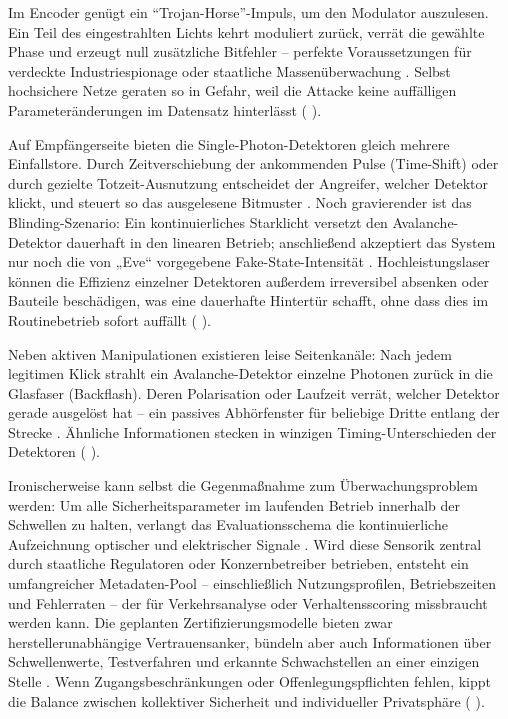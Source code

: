 Im Encoder genügt ein “Trojan-Horse”-Impuls, um den Modulator auszulesen. Ein Teil des eingestrahlten Lichts kehrt moduliert zurück, verrät die gewählte Phase und erzeugt null zusätzliche Bitfehler – perfekte Voraussetzungen für verdeckte Industriespionage oder staatliche Massenüberwachung . Selbst hochsichere Netze geraten so in Gefahr, weil die Attacke keine auffälligen Parameteränderungen im Datensatz hinterlässt (\cite{sunReviewSecurityEvaluation2022} ).

Auf Empfängerseite bieten die Single-Photon-Detektoren gleich mehrere Einfallstore. Durch Zeitverschiebung der ankommenden Pulse (Time-Shift) oder durch gezielte Totzeit-Ausnutzung entscheidet der Angreifer, welcher Detektor klickt, und steuert so das ausgelesene Bitmuster . Noch gravierender ist das Blinding-Szenario: Ein kontinuierliches Starklicht versetzt den Avalanche-Detektor dauerhaft in den linearen Betrieb; anschließend akzeptiert das System nur noch die von „Eve“ vorgegebene Fake-State-Intensität . Hochleistungslaser können die Effizienz einzelner Detektoren außerdem irreversibel absenken oder Bauteile beschädigen, was eine dauerhafte Hintertür schafft, ohne dass dies im Routinebetrieb sofort auffällt (\cite{sunReviewSecurityEvaluation2022} ).

Neben aktiven Manipulationen existieren leise Seitenkanäle: Nach jedem legitimen Klick strahlt ein Avalanche-Detektor einzelne Photonen zurück in die Glasfaser (Backflash). Deren Polarisation oder Laufzeit verrät, welcher Detektor gerade ausgelöst hat – ein passives Abhörfenster für beliebige Dritte entlang der Strecke . Ähnliche Informationen stecken in winzigen Timing-Unterschieden der Detektoren (\cite{sunReviewSecurityEvaluation2022} ).

Ironischerweise kann selbst die Gegenmaßnahme zum Überwachungsproblem werden: Um alle Sicherheitsparameter im laufenden Betrieb innerhalb der Schwellen zu halten, verlangt das Evaluationsschema die kontinuierliche Aufzeichnung optischer und elektrischer Signale . Wird diese Sensorik zentral durch staatliche Regulatoren oder Konzernbetreiber betrieben, entsteht ein umfangreicher Metadaten-Pool – einschließlich Nutzungsprofilen, Betriebszeiten und Fehlerraten – der für Verkehrsanalyse oder Verhaltensscoring missbraucht werden kann. Die geplanten Zertifizierungsmodelle bieten zwar herstellerunabhängige Vertrauensanker, bündeln aber auch Informationen über Schwellenwerte, Testverfahren und erkannte Schwachstellen an einer einzigen Stelle . Wenn Zugangsbeschränkungen oder Offenlegungspflichten fehlen, kippt die Balance zwischen kollektiver Sicherheit und individueller Privatsphäre (\cite{sunReviewSecurityEvaluation2022} ).






